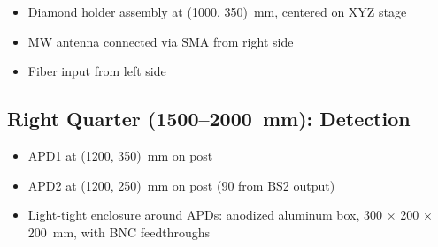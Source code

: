 \documentclass[11pt,a4paper,openany]{book}
\begin{document}
\begin{itemize}[nosep]
  \item Diamond holder assembly at (1000, 350)~mm, centered on XYZ stage
  \item MW antenna connected via SMA from right side
  \item Fiber input from left side
\end{itemize}

\subsection{Right Quarter (1500--2000~mm): Detection}

\begin{itemize}[nosep]
  \item APD1 at (1200, 350)~mm on post
  \item APD2 at (1200, 250)~mm on post (90\textdegree{} from BS2 output)
  \item Light-tight enclosure around APDs: anodized aluminum box, 300 $\times$ 200 $\times$ 200~mm, with BNC feedthroughs
\end{itemize}
\end{document}
